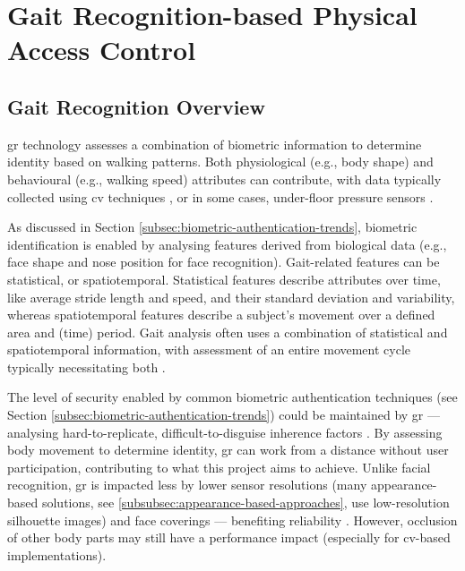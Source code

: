 \section{Gait Recognition-based Physical Access Control}
\label{sec:gait-recognition-for-physical-access-control}

\subsection{Gait Recognition Overview}
\label{subsec:gait-recognition-overview}

\ac{gr} technology assesses a combination of biometric information to determine identity based on walking patterns.
Both physiological (e.g., body shape) and behavioural (e.g., walking speed) attributes can contribute, with data typically collected using \ac{cv} techniques \cite{mallickFastGaitRecognition2016}, or in some cases, under-floor pressure sensors \parencite{stepscanGaitAuthenticationSecurity2020}.

As discussed in Section \ref{subsec:biometric-authentication-trends}, biometric identification is enabled by analysing features derived from biological data (e.g., face shape and nose position for face recognition).
Gait-related features can be statistical, or spatiotemporal.
Statistical features describe attributes over time, like average stride length and speed, and their standard deviation and variability, whereas spatiotemporal features describe a subject's movement over a defined area and (time) period.
Gait analysis often uses a combination of statistical and spatiotemporal information, with assessment of an entire movement cycle typically necessitating both \parencite{gunersahanSurveyAppearancebasedApproaches2024}.

The level of security enabled by common biometric authentication techniques (see Section \ref{subsec:biometric-authentication-trends}) could be maintained by \ac{gr} --- analysing hard-to-replicate, difficult-to-disguise inherence factors \parencite{nevesChapter1Unconstrained2017a}.
By assessing body movement to determine identity, \ac{gr} can work from a distance without user participation, contributing to what this project aims to achieve.
Unlike facial recognition, \ac{gr} is impacted less by lower sensor resolutions (many appearance-based solutions, see \ref{subsubsec:appearance-based-approaches}, use low-resolution silhouette images) and face coverings --- benefiting reliability \parencite{cooperEffectsFaceCoverings2022}.
However, occlusion of other body parts may still have a performance impact (especially for \ac{cv}-based implementations).

